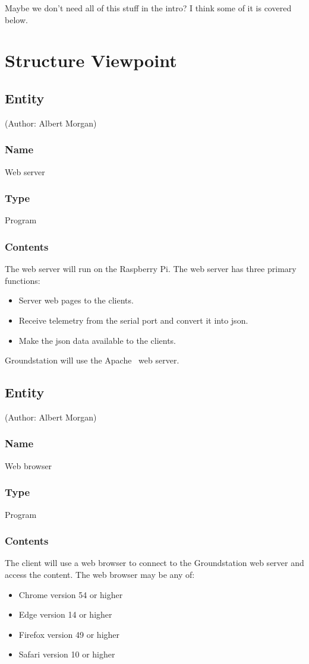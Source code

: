 \documentclass[10pt,draftclsnofoot,onecolumn]{IEEEtran}
\newcommand{\newelement}[5]{
	\subsection{#1} (Author: #2)
	\subsubsection{Name}
	#3
	\subsubsection{Type}
	#4
	\subsubsection{Contents}
	#5
}
\begin{document}
	Maybe we don't need all of this stuff in the intro? I think some of it is covered below.

	
	
	\section{Structure Viewpoint}
		
	
	
	
	\newelement
	{Entity}
	{Albert Morgan}
	{Web server}
	{Program}
	{	The web server will run on the Raspberry Pi. The web server has three primary functions:
		\begin{itemize}
			\item Server web pages to the clients.
			\item Receive telemetry from the serial port and convert it into json.
			\item Make the json data available to the clients.
		\end{itemize}
		Groundstation will use the Apache~\cite{Apache} web server.
	}


	\newelement
	{Entity}
	{Albert Morgan}
	{Web browser}
	{Program}
	{	The client will use a web browser to connect to the Groundstation web server and access the content.
		The web browser may be any of:
		\begin{itemize}
			\item Chrome version 54 or higher
			\item Edge version 14 or higher
			\item Firefox version 49 or higher
			\item Safari version 10 or higher
		\end{itemize}
	}


	
\end{document}
